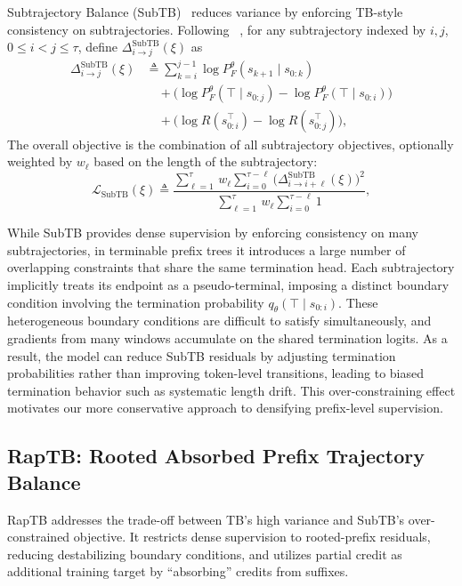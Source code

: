 \documentclass{article}
\theoremstyle{plain}
\theoremstyle{definition}
\theoremstyle{remark}
\begin{document}
Subtrajectory Balance (SubTB)~\citep{madan2023learning} reduces variance by enforcing TB-style consistency on subtrajectories. Following ~\citet{hu2023gflownet}, for any subtrajectory indexed by $i,j$, $0\le i<j\le \tau$, define $\Delta^{\mathrm{SubTB}}_{i\to j}(\xi)$ as
\begin{equation}
\label{eq:msubtb_residual}
\begin{aligned}
\Delta^{\mathrm{SubTB}}_{i\to j}(\xi)
&\triangleq
\sum_{k=i}^{j-1}\log P_F^\theta(s_{k+1}\mid s_{0:k})
\\
&\quad+
\big(\log P_F^\theta(\top\mid s_{0:j})-\log P_F^\theta(\top\mid s_{0:i})\big)
\\
&\quad+
\big(\log R(s_{0:i}^{\top})-\log R(s_{0:j}^{\top})\big),
\end{aligned}
\end{equation}
The overall objective is the combination of all subtrajectory objectives, optionally weighted by $w_\ell$ based on the length of the subtrajectory:
\begin{equation}
\label{eq:msubtb_loss}
\mathcal{L}_{\mathrm{SubTB}}(\xi)
\triangleq
\frac{\sum_{\ell=1}^{\tau}\,w_\ell\sum_{i=0}^{\tau-\ell}\big(\Delta^{\mathrm{SubTB}}_{i\to i+\ell}(\xi)\big)^2}
{\sum_{\ell=1}^{\tau}\,w_\ell\sum_{i=0}^{\tau-\ell} 1},
\end{equation}

While SubTB provides dense supervision by enforcing consistency on many subtrajectories, in terminable prefix trees it introduces a large number of overlapping constraints that share the same termination head.
Each subtrajectory implicitly treats its endpoint as a pseudo-terminal, imposing a distinct boundary condition involving the termination probability $q_\theta(\top\mid s_{0:i})$.
These heterogeneous boundary conditions are difficult to satisfy simultaneously, and gradients from many windows accumulate on the shared termination logits.
As a result, the model can reduce SubTB residuals by adjusting termination probabilities rather than improving token-level transitions, leading to biased termination behavior such as systematic length drift.
This over-constraining effect motivates our more conservative approach to densifying prefix-level supervision.

\subsection{RapTB: Rooted Absorbed Prefix Trajectory Balance}

RapTB addresses the trade-off between TB's high variance and SubTB's over-constrained objective. It restricts dense supervision to rooted-prefix residuals, reducing destabilizing boundary conditions, and utilizes partial credit as additional training target by ``absorbing'' credits from suffixes.
\end{document}
